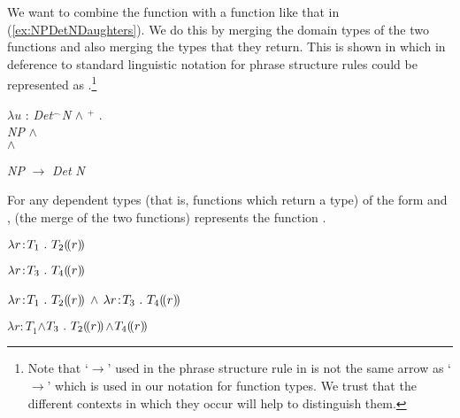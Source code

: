 We want to combine the function \preveg{} with a function like that in
(\ref{ex:NPDetNDaughters}). We do this by merging the domain types of
the two functions and also merging the types that they return.  This
is shown in  which in deference to standard linguistic
notation for phrase structure rules could be represented as
.\footnote{Note that `$\longrightarrow$' used in the phrase
  structure rule in  is not the same arrow as `$\rightarrow$'
  which is used in our notation for function types.  We trust that the
  different contexts in which they occur will help to distinguish them.}
\begin{ex} 
\begin{subex}
\item  $\lambda u$ : \textit{Det}$^{\frown}$\textit{N} \d{$\wedge$} $^+$ . \\
\hspace*{1em}\textit{NP} \d{$\wedge$}
\\
\hspace*{2.5em}\d{$\wedge$}

\item \textit{NP} $\longrightarrow$ \textit{Det} \textit{N}
\end{subex}
\label{eg:NPDetN}
\end{ex}

For any dependent types (that is, functions which return a type) of
the form  and ,  (the merge of the two
functions) represents the function .
\begin{ex} 
\begin{subex} 
 
\item $\lambda r\!:\!T_1\ .\ T_2\dep{r}$ 
 
\item $\lambda r\!:\!T_3\ .\ T_4\dep{r}$
  
\item $\lambda r\!:\!T_1\ .\ T_2\dep{r}$ \d{\d{$\wedge$}} $\lambda
  r\!:\!T_3\ .\ T_4\dep{r}$
  
\item $\lambda r\!:\!T_1$\d{$\wedge$}$T_3\ .\
T_2(\!(r)\!)$\d{$\wedge$}$T_4(\!(r)\!)$
 
\end{subex} 
   
\end{ex} 

